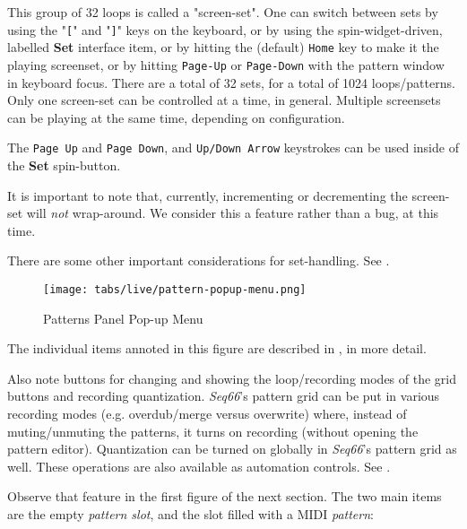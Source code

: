   This group of 32 loops is called a "screen-set".
   One can switch between sets by using the
   \index{keys![}
   "\texttt{[}" and
   \index{keys!]}
   "\texttt{]}" keys on the keyboard, or by using
   the spin-widget-driven, labelled \textbf{Set} interface item, or
   by hitting the (default) \texttt{Home} key to make it the playing screenset,
   or by hitting \texttt{Page-Up} or \texttt{Page-Down} with the pattern window
   in keyboard focus.
   There are a total of 32 sets, for a total of 1024 loops/patterns. 
   Only one screen-set can be controlled at a time, in general.
   Multiple screensets can be playing at the same time, depending on
   configuration.

   The \texttt{Page Up} and \texttt{Page Down}, and \texttt{Up/Down Arrow}
   keystrokes can be used inside of the \textbf{Set} spin-button.

   It is important to note that, currently, incrementing or decrementing
   the screen-set will \textsl{not} wrap-around.
   We consider this a feature rather than a bug, at this time.

   There are some other important considerations for set-handling.
   See .

\begin{figure}[H]
   \centering 
   \texttt{[image: tabs/live/pattern-popup-menu.png]}
   \caption{Patterns Panel Pop-up Menu}
   \label{fig:patterns_panel_popup_menu}
\end{figure}

   The individual items annoted in this figure are described in
   , in more detail.

   Also note buttons for changing and showing the
   loop/recording modes of the grid buttons and recording quantization.
   \textsl{Seq66}'s pattern grid can be put in various recording
   modes (e.g. overdub/merge versus overwrite) where, instead of
   muting/unmuting the patterns, it turns on recording (without opening the
   pattern editor).
   Quantization can be turned on globally in \textsl{Seq66}'s pattern grid
   as well.
   These operations are also available as automation controls.
   See .

   Observe that feature in the first figure of the next section.
   The two main items are the empty \textsl{pattern slot}, and the slot filled
   with a MIDI \textsl{pattern}:

